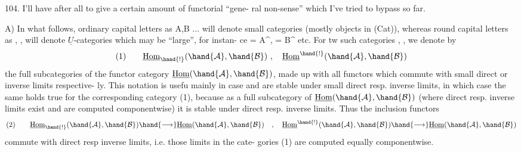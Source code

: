 
104.    I'll have after all to give a certain amount of functorial ``gene-%
ral non-sense''  which I've tried to bypass so far.

A)  In what follows,  ordinary capital letters as A,B ... will  denote
small categories (mostly objects in (Cat)),  whereas round capital letters
as ,  ,   will denote  $\underline{U}$-categories which may be ``large'',  for instan-%
ce = A\^{}, = B\^{} etc.   For tw such categories  ,  ,  we denote by
\[ (1) \qquad \underline{\mathrm{Hom}}_{\hand{!}}(\hand{\mathcal{A}},\hand{\mathcal{B}}) \ , \quad \underline{\mathrm{Hom}}^{\hand{!}}(\hand{\mathcal{A}},\hand{\mathcal{B}}) \]
the full subcategories of the functor category $\underline{\mathrm{Hom}}(\hand{\mathcal{A}},\hand{\mathcal{B}})$,  made up with
all functors which commute with small direct or inverse limits respective-%
ly.  This notation is usefu mainly in case  and  are stable under
small direct resp. inverse limits,  in which case the same holds true for
the corresponding category (1),  because as a full subcategory of
$\underline{\mathrm{Hom}}(\hand{\mathcal{A}},\hand{\mathcal{B}})$ (where direct resp. inverse limits exist and are computed
componentwise) it is stable under direct resp. inverse limits.  Thus the
inclusion functors
\[ (2) \qquad \underline{\mathrm{Hom}}_{\hand{!}}(\hand{\mathcal{A}},\hand{\mathcal{B}}) \hand{\longrightarrow} \underline{\mathrm{Hom}}(\hand{\mathcal{A}},\hand{\mathcal{B}}) \quad , \quad \underline{\mathrm{Hom}}^{\hand{!}}(\hand{\mathcal{A}},\hand{\mathcal{B}}) \hand{\longrightarrow} \underline{\mathrm{Hom}}(\hand{\mathcal{A}},\hand{\mathcal{B}}) \]
commute with direct resp inverse limits,  i.e. those limits in the cate-%
gories (1) are computed equally componentwise.

